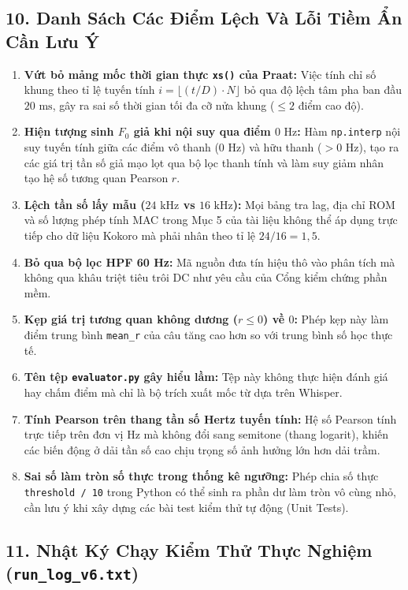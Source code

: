 \documentclass[11pt,a4paper]{article}
\begin{document}
\subsection*{10. Danh Sách Các Điểm Lệch Và Lỗi Tiềm Ẩn Cần Lưu Ý}

\begin{enumerate}
    \setlength{\itemsep}{2.5pt}
    \item \textbf{Vứt bỏ mảng mốc thời gian thực \texttt{xs()} của Praat:} Việc tính chỉ số khung theo tỉ lệ tuyến tính $i = \lfloor (t/D) \cdot N \rfloor$ bỏ qua độ lệch tâm pha ban đầu $20\text{ ms}$, gây ra sai số thời gian tối đa cỡ nửa khung ($\le 2$ điểm cao độ).
    \item \textbf{Hiện tượng sinh $F_0$ giả khi nội suy qua điểm $0\text{ Hz}$:} Hàm \texttt{np.interp} nội suy tuyến tính giữa các điểm vô thanh ($0\text{ Hz}$) và hữu thanh ($> 0\text{ Hz}$), tạo ra các giá trị tần số giả mạo lọt qua bộ lọc thanh tính và làm suy giảm nhân tạo hệ số tương quan Pearson $r$.
    \item \textbf{Lệch tần số lấy mẫu ($24\text{ kHz}$ vs $16\text{ kHz}$):} Mọi bảng tra lag, địa chỉ ROM và số lượng phép tính MAC trong Mục 5 của tài liệu không thể áp dụng trực tiếp cho dữ liệu Kokoro mà phải nhân theo tỉ lệ $24/16 = 1{,}5$.
    \item \textbf{Bỏ qua bộ lọc HPF 60 Hz:} Mã nguồn đưa tín hiệu thô vào phân tích mà không qua khâu triệt tiêu trôi DC như yêu cầu của Cổng kiểm chứng phần mềm.
    \item \textbf{Kẹp giá trị tương quan không dương ($r \le 0$) về $0$:} Phép kẹp này làm điểm trung bình \texttt{mean\_r} của câu tăng cao hơn so với trung bình số học thực tế.
    \item \textbf{Tên tệp \texttt{evaluator.py} gây hiểu lầm:} Tệp này không thực hiện đánh giá hay chấm điểm mà chỉ là bộ trích xuất mốc từ dựa trên Whisper.
    \item \textbf{Tính Pearson trên thang tần số Hertz tuyến tính:} Hệ số Pearson tính trực tiếp trên đơn vị Hz mà không đổi sang semitone (thang logarit), khiến các biến động ở dải tần số cao chịu trọng số ảnh hưởng lớn hơn dải trầm.
    \item \textbf{Sai số làm tròn số thực trong thống kê ngưỡng:} Phép chia số thực \texttt{threshold / 10} trong Python có thể sinh ra phần dư làm tròn vô cùng nhỏ, cần lưu ý khi xây dựng các bài test kiểm thử tự động (Unit Tests).
\end{enumerate}

\subsection*{11. Nhật Ký Chạy Kiểm Thử Thực Nghiệm (\texttt{run\_log\_v6.txt})}
\end{document}
